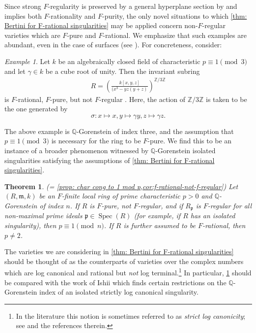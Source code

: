\documentclass[reqno,11pt]{amsart}
\numberwithin{equation}{section}
\newtheorem{Theoremx}{Theorem}
\theoremstyle{definition}
\theoremstyle{definition}
\theoremstyle{definition}
\theoremstyle{remark}
\newtheorem{example}[theorem]{Example}
\newcommand{\Spec}{\operatorname{Spec}}
\newcommand{\Z}{\mathbb{Z}}
\newcommand{\Q}{\mathbb{Q}}
\newcommand{\fm}{\mathfrak{m}}
\newcommand{\fp}{\mathfrak{p}}
\begin{document}
Since strong $F$-regularity is preserved by a general hyperplane section by \cite[Theorem 6.1]{SZ13} and implies both $F$-rationality and $F$-purity, the only novel situations to which \cref{thm: Bertini for F-rational singularities} may be applied concern non-$F$-regular varieties which are $F$-pure and $F$-rational. We emphasize that such examples are abundant, even in the case of surfaces (see \cite{Wat91}). For concreteness, consider:

\begin{example} Let $k$ be an algebraically closed field of characteristic $p\equiv 1\pmod 3$ and let $\gamma\in k$ be a cube root of unity. Then the invariant subring
\begin{align*}
    R = \left(\frac{k[x,y,z]}{(x^3-yz(y+z)}\right)^{\Z/3\Z}
\end{align*}
is $F$-rational, $F$-pure, but not $F$-regular \cite[Example 7.16]{HH94b}. Here, the action of $\Z/3\Z$ is taken to be the one generated by $$\sigma\colon x\mapsto x,y\mapsto \gamma y, z\mapsto \gamma z.$$
\end{example} The above example is $\Q$-Gorenstein of index three, and the assumption that $p\equiv 1\pmod 3$ is necessary for the ring to be $F$-pure. We find this to be an instance of a broader phenomenon witnessed by $\Q$-Gorenstein isolated singularities satisfying the assumptions of \cref{thm: Bertini for F-rational singularities}.

\begin{Theoremx}\label{mainthm:index} (= \cref{prop: char cong to 1 mod p,cor:f-rational-not-f-regular})
    Let $(R,\fm,k)$ be an $F$-finite local ring of prime characteristic $p>0$ and $\mathbb{Q}$-Gorenstein of index $n$. If $R$ is $F$-pure, not $F$-regular, and if $R_{\fp}$ is $F$-regular for all non-maximal prime ideals $\fp\in\Spec(R)$ (for example, if $R$ has an isolated singularity), then $p\equiv 1\pmod{n}$. If $R$ is further assumed to be $F$-rational, then $p\neq 2$.
\end{Theoremx}

The varieties we are considering in \cref{thm: Bertini for F-rational singularities} should be thought of as the counterparts of varieties over the complex numbers which are log canonical and rational but \emph{not} log terminal.\footnote{In the literature this notion is sometimes referred to as \emph{strict log canonicity}; see \cite{Fuj16} and the references therein.} In particular, \cref{mainthm:index} should be compared with the work of Ishii \cite{Ish00} which finds certain restrictions on the $\Q$-Gorenstein index of an isolated strictly log canonical singularity.
\end{document}
